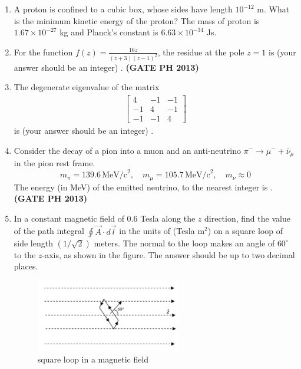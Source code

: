 \documentclass[14pt, a4paper]{extarticle}
\renewcommand{\vec}[1]{\overrightarrow{#1}}
\newcommand{\myvec}[1]{\begin{bmatrix} #1 \end{bmatrix}}
\begin{document}
\begin{enumerate}[label=\textbf{Q. \arabic*}]
\item A proton is confined to a cubic box, whose sides have length $10^{-12}$ m. What is the minimum kinetic energy of the proton? The mass of proton is $1.67 \times 10^{-27}$ kg and Planck's constant is $6.63 \times 10^{-34}$ Js.
\begin{enumerate}
\end{enumerate}


\item For the function $f(z) = \frac{16z}{(z+3)(z-1)^2}$, the residue at the pole $z = 1$ is (your answer should be an integer) \underline{\hspace{5em}}.
\hfill \textbf{(GATE PH 2013)}


\item The degenerate eigenvalue of the matrix
\begin{align*}
\myvec{4 & -1 & -1 \\ -1 & 4 & -1 \\ -1 & -1 & 4}
\end{align*}
is (your answer should be an integer) \underline{\hspace{5cm}}.

\item Consider the decay of a pion into a muon and an anti-neutrino $\pi^- \to \mu^- + \bar{\nu}_\mu$ in the pion rest frame.
\[ m_\pi = 139.6\,\text{MeV/c}^2,\quad m_\mu = 105.7\,\text{MeV/c}^2,\quad m_\nu \approx 0 \]
The energy (in MeV) of the emitted neutrino, to the nearest integer is \underline{\hspace{5em}}.
\hfill \textbf{(GATE PH 2013)}

\item In a constant magnetic field of 0.6 Tesla along the $z$ direction, find the value of the path integral $\oint \vec{A} \cdot d\vec{l}$ in the units of (Tesla m$^2$) on a square loop of side length $(1/\sqrt{2})$ meters. The normal to the loop makes an angle of $60^{\circ}$ to the $z$-axis, as shown in the figure. The answer should be up to two decimal places. \underline{\hspace{5cm}}
\begin{figure}[H]
\centering
\includegraphics[width=0.6\textwidth]{figs/q44fig13.png}
\caption{square loop in a magnetic field}
\label{fig:q44}
\end{figure}


\end{enumerate}
\end{document}
